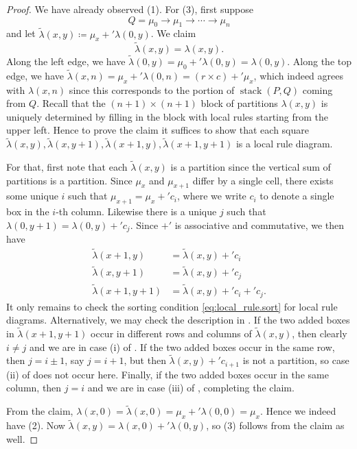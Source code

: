 \documentclass{amsart}
\theoremstyle{definition}
\DeclareMathOperator{\stack}{stack}
\newcommand{\vsum}{+'}
\begin{document}
\begin{proof}
    We have already observed (1). For (3), first suppose
      \[ Q = \mu_0 \to \mu_1 \to \cdots \to \mu_n \]
    and let $\tilde{\lambda}(x, y) \coloneqq \mu_x \vsum \lambda(0,y)$. We claim
      \[ \tilde{\lambda}(x,y) = \lambda(x,y). \]
    Along the left edge, we have $\tilde{\lambda}(0, y) = \mu_0 \vsum \lambda(0, y) = \lambda(0, y)$. Along the top edge, we have $\tilde{\lambda}(x, n) = \mu_x \vsum \lambda(0, n) = (r \times c) \vsum \mu_x$, which indeed agrees with $\lambda(x, n)$ since this corresponds to the portion of $\stack(P, Q)$ coming from $Q$. Recall that the $(n+1) \times (n+1)$ block of partitions $\lambda(x, y)$ is uniquely determined by filling in the block with local rules starting from the upper left. Hence to prove the claim it suffices to show that each square $\tilde{\lambda}(x,y), \tilde{\lambda}(x,y+1), \tilde{\lambda}(x+1,y), \tilde{\lambda}(x+1,y+1)$ is a local rule diagram.
    
    For that, first note that each $\tilde{\lambda}(x,y)$ is a partition since the vertical sum of partitions is a partition. Since $\mu_x$ and $\mu_{x+1}$ differ by a single cell, there exists some unique $i$ such that $\mu_{x+1} = \mu_x \vsum c_i$, where we write $c_i$ to denote a single box in the $i$-th column. Likewise there is a unique $j$ such that $\lambda(0,y+1) = \lambda(0,y) \vsum c_j$. Since $\vsum$ is associative and commutative, we then have
    \begin{align*}
        \tilde{\lambda}(x+1,y) &= \tilde{\lambda}(x,y) \vsum c_i \\
        \tilde{\lambda}(x,y+1) &= \tilde{\lambda}(x,y) \vsum c_j \\
        \tilde{\lambda}(x+1,y+1) &= \tilde{\lambda}(x,y) \vsum c_i \vsum c_j.
    \end{align*}
    It only remains to check the sorting condition \eqref{eq:local_rule.sort} for local rule diagrams. Alternatively, we may check the description in . If the two added boxes in $\tilde{\lambda}(x+1,y+1)$ occur in different rows and columns of $\tilde{\lambda}(x, y)$, then clearly $i \neq j$ and we are in case (i) of . If the two added boxes occur in the same row, then $j=i \pm 1$, say $j=i+1$, but then $\tilde{\lambda}(x,y) \vsum c_{i+1}$ is not a partition, so case (ii) of  does not occur here. Finally, if the two added boxes occur in the same column, then $j=i$ and we are in case (iii) of , completing the claim.
    
    From the claim, $\lambda(x,0) = \tilde{\lambda}(x,0) = \mu_x \vsum \lambda(0,0) = \mu_x$. Hence we indeed have (2). Now $\tilde{\lambda}(x,y) = \lambda(x,0) \vsum \lambda(0,y)$, so (3) follows from the claim as well.
\end{proof}
\end{document}
